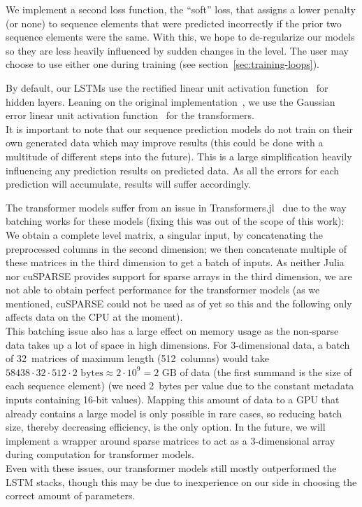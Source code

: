 We implement a second loss function, the ``soft'' loss, that assigns a
lower penalty (or none) to sequence elements that were predicted
incorrectly if the prior two sequence elements were the same. With
this, we hope to de-regularize our models so they are less heavily
influenced by sudden changes in the level. The user may choose to use
either one during training (see section~\ref{sec:training-loops}).

By default, our LSTMs use the rectified linear unit activation
function~\cite{nairRectifiedLinearUnits,RectifierNeuralNetworks2019}
for hidden layers. Leaning on the original
implementation~\cite{OpenaiGpt22019}, we use the Gaussian error linear
unit activation function~\cite{hendrycksGaussianErrorLinear2018} for
the transformers. \\
It is important to note that our sequence prediction models do not
train on their own generated data which may improve results (this
could be done with a multitude of different steps into the future).
This is a large simplification heavily influencing any prediction
results on predicted data. As all the errors for each prediction will
accumulate, results will suffer accordingly.

The transformer models suffer from an issue in
\mbox{Transformers.jl}~\cite{peterChengchingwenTransformersJl2019} due
to the way batching works for these models (fixing this was out of the
scope of this work): We obtain a complete level matrix, a singular
input, by concatenating the preprocessed columns in the second
dimension; we then concatenate multiple of these matrices in the third
dimension to get a batch of inputs. As neither Julia nor cuSPARSE
provides support for sparse arrays in the third dimension, we are not
able to obtain perfect performance for the transformer models (as we
mentioned, cuSPARSE could not be used as of yet so this and the
following only affects data on the CPU at the moment). \\
This batching issue also has a large effect on memory usage as the
non-sparse data takes up a lot of space in high dimensions. For
3-dimensional data, a batch of 32~matrices of maximum length
(512~columns) would take
$58438 \cdot 32 \cdot 512 \cdot 2\text{ bytes} \approx 2 \cdot 10^{9} = 2\text{ GB}$ of data
(the first summand is the size of each sequence element) (we need
2~bytes per value due to the constant metadata inputs containing
16-bit values). Mapping this amount of data to a GPU that already
contains a large model is only possible in rare cases, so reducing
batch size, thereby decreasing efficiency, is the only option. In the
future, we will implement a wrapper around sparse matrices to act as a
3-dimensional array during computation for transformer models. \\
Even with these issues, our transformer models still mostly
outperformed the LSTM stacks, though this may be due to inexperience
on our side in choosing the correct amount of parameters.

